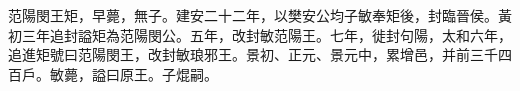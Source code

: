 
\begin{pinyinscope}
范陽閔王矩，早薨，無子。建安二十二年，以樊安公均子敏奉矩後，封臨晉侯。黃初三年追封謚矩為范陽閔公。五年，改封敏范陽王。七年，徙封句陽，太和六年，追進矩號曰范陽閔王，改封敏琅邪王。景初、正元、景元中，累增邑，并前三千四百戶。敏薨，謚曰原王。子焜嗣。


\end{pinyinscope}